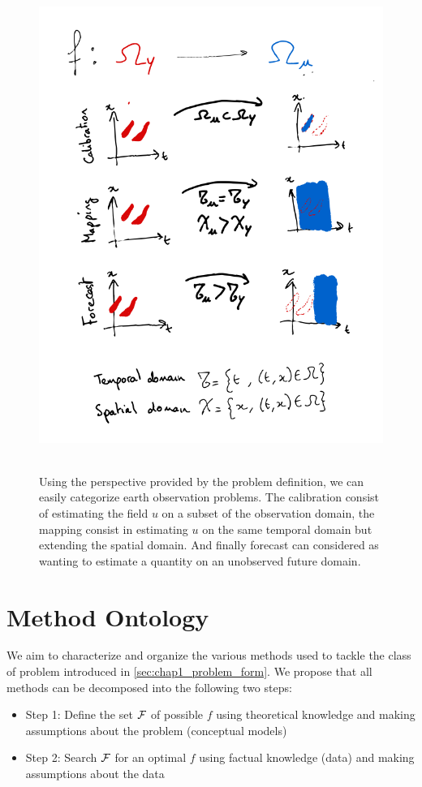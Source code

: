 \begin{bibunit}
{{{{\begin{figure}[htbp]
\begin{center}
\includegraphics[width=0.8\linewidth]{Chapitre1/Ch1-Figures/Task_ontology.png} \
\end{center}
\caption[Task characterization through the domains $\Omega_u$ and $\Omega_y$ of $u$ and $y$]
{\footnotesize Using the perspective provided by the problem definition, we can easily categorize earth observation problems.
The calibration consist of estimating the field $u$ on a subset of the observation domain, the mapping consist in estimating $u$ on the same temporal domain but extending the spatial domain.
And finally forecast can considered as wanting to estimate a quantity on an unobserved future domain.}
\label{fig:task_ontology}
\end{figure}

\section{Method Ontology}
We aim to characterize and organize the various methods used to tackle the class of problem introduced in \ref{sec:chap1_problem_form}. We propose that all methods can be decomposed into the following two steps:
\begin{itemize}
\item Step 1: Define the set $\cal{F}$ of possible $f$ using theoretical knowledge and making assumptions about the problem (conceptual models)
\item Step 2: Search $\cal{F}$ for an optimal $f$ using factual knowledge (data) and making assumptions about the data
\end{itemize}

}}}}
\end{bibunit}
